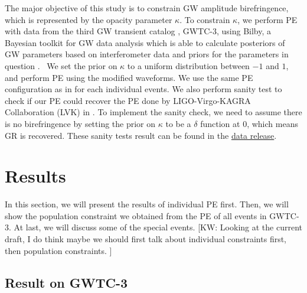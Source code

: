 \documentclass[aps,prd,twocolumn,superscriptaddress,preprintnumbers,floatfix,nofootinbib]{revtex4-2}
\newcommand{\kw}[1]{{\color{rb4}[KW: #1 ]}}
\begin{document}
The major objective of this study is to constrain GW amplitude birefringence, which is represented by the opacity parameter $\kappa$.
To constrain $\kappa$, we perform PE with data from the third GW transient catalog \citep{GWTC-2.1, GWTC-3}, GWTC-3, using Bilby, a Bayesian toolkit for GW data analysis which is able to calculate posteriors of GW parameters based on interferometer data and priors for the parameters in question \citep{Bilby}. \
We set the prior on $\kappa$ to a uniform distribution between $-1$ and $1$, and perform PE using the modified waveforms.
We use the same PE configuration as in \citet{GWTC-2.1, GWTC-3} for each individual events.
We also perform sanity test to check if our PE could recover the PE done by LIGO-Virgo-KAGRA Collaboration (LVK) in \citet{GWTC-2.1, GWTC-3}.
To implement the sanity check, we need to assume there is no birefringence by setting the prior on $\kappa$ to be a $\delta$ function at $0$, which means GR is recovered.
These sanity tests result can be found in the \href{https://zenodo.org/record/7338924}{data release}.

\section{Results}
\label{sec:Results}

In this section, we will present the results of individual PE first.
Then, we will show the population constraint we obtained from the PE of all events in GWTC-3.
At last, we will discuss some of the special events.
\kw{Looking at the current draft, I do think maybe we should first talk about individual constraints first, then population constraints.}

\subsection{Result on GWTC-3}
\end{document}
